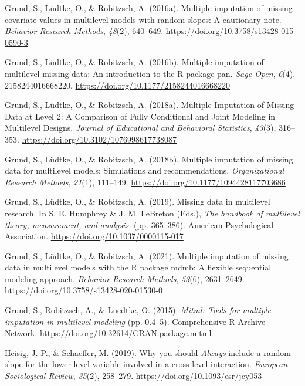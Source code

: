 \documentclass[
  letterpaper,
  11pt,
  english,
  singlespacing,
  headsepline,
  openany]{MastersDoctoralThesis}
\newlength{\cslhangindent}
\newenvironment{CSLReferences}[2] %
 {\begin{list}{}{%
  \setlength{\itemindent}{0pt}
  \setlength{\leftmargin}{0pt}
  \setlength{\parsep}{0pt}
  \ifodd #1
   \setlength{\leftmargin}{\cslhangindent}
   \setlength{\itemindent}{-1\cslhangindent}
  \fi
  \setlength{\itemsep}{#2\baselineskip}}}
 {\end{list}}
\begin{document}
\begin{CSLReferences}{1}{0}
Grund, S., Lüdtke, O., \& Robitzsch, A. (2016a). Multiple imputation of
missing covariate values in multilevel models with random slopes: A
cautionary note. \emph{Behavior Research Methods}, \emph{48}(2),
640--649. \url{https://doi.org/10.3758/s13428-015-0590-3}

Grund, S., Lüdtke, O., \& Robitzsch, A. (2016b). Multiple imputation of
multilevel missing data: {An} introduction to the {R} package pan.
\emph{Sage Open}, \emph{6}(4), 2158244016668220.
\url{https://doi.org/10.1177/2158244016668220}

Grund, S., Lüdtke, O., \& Robitzsch, A. (2018a). Multiple {Imputation}
of {Missing Data} at {Level} 2: {A Comparison} of {Fully Conditional}
and {Joint Modeling} in {Multilevel Designs}. \emph{Journal of
Educational and Behavioral Statistics}, \emph{43}(3), 316--353.
\url{https://doi.org/10.3102/1076998617738087}

Grund, S., Lüdtke, O., \& Robitzsch, A. (2018b). Multiple imputation of
missing data for multilevel models: {Simulations} and recommendations.
\emph{Organizational Research Methods}, \emph{21}(1), 111--149.
\url{https://doi.org/10.1177/1094428117703686}

Grund, S., Lüdtke, O., \& Robitzsch, A. (2019). Missing data in
multilevel research. In S. E. Humphrey \& J. M. LeBreton (Eds.),
\emph{The handbook of multilevel theory, measurement, and analysis.}
(pp. 365--386). American Psychological Association.
\url{https://doi.org/10.1037/0000115-017}

Grund, S., Lüdtke, O., \& Robitzsch, A. (2021). Multiple imputation of
missing data in multilevel models with the {R} package mdmb: A flexible
sequential modeling approach. \emph{Behavior Research Methods},
\emph{53}(6), 2631--2649.
\url{https://doi.org/10.3758/s13428-020-01530-0}

Grund, S., Robitzsch, A., \& Luedtke, O. (2015). \emph{Mitml: {Tools}
for multiple imputation in multilevel modeling} (pp. 0.4--5).
Comprehensive R Archive Network.
\url{https://doi.org/10.32614/CRAN.package.mitml}

Heisig, J. P., \& Schaeffer, M. (2019). Why you should {\emph{Always}}
include a random slope for the lower-level variable involved in a
cross-level interaction. \emph{European Sociological Review},
\emph{35}(2), 258--279. \url{https://doi.org/10.1093/esr/jcy053}


\end{CSLReferences}
\end{document}
